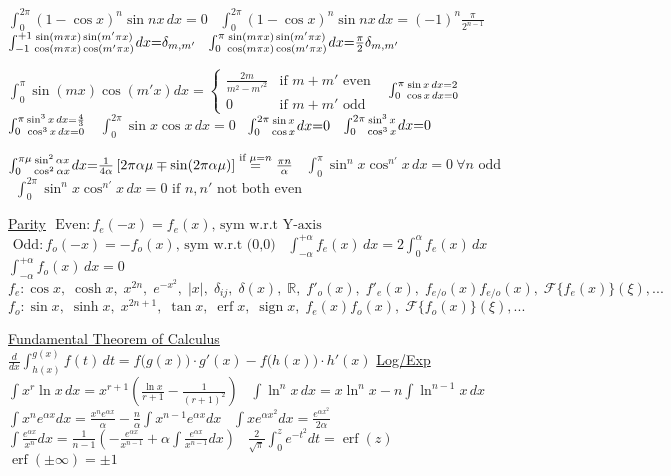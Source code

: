 {$\int_0^{2\pi}\!(1{-}\cos x)^n\sin nx\,dx{=}0$ \
$\int_0^{2\pi}\!(1{-}\cos x)^n\sin nx\,dx{=}(-1)^n\frac{\pi}{2^{n-1}}$ \
$\int_{-1}^{+1}\!\genfrac{}{}{0pt}{}{\sin(m\pi x)\sin(m'\pi x)}{\cos(m\pi x)\cos(m'\pi x)}dx{=}\delta_{m,m'}$ \
$\int_0^\pi\!\genfrac{}{}{0pt}{}{\sin(m\pi x)\sin(m'\pi x)}{\cos(m\pi x)\cos(m'\pi x)}dx{=}\frac{\pi}{2}\delta_{m,m'}$

$\int_0^\pi\!\sin(mx)\cos(m'x)dx{=}\begin{cases}\frac{2m}{m^2-m'^2}&\text{if }m{+}m'\text{ even}\\0&\text{if }m{+}m'\text{ odd}\end{cases}$ \
$\int_0^\pi\!\genfrac{}{}{0pt}{}{\sin x\,dx{=}2}{\cos x\,dx{=}0}$ \
$\int_0^\pi\!\genfrac{}{}{0pt}{}{\sin^3x\,dx{=}\frac{4}{3}}{\cos^3x\,dx{=}0}$ \
$\int_0^{2\pi}\!\sin x\cos x\,dx{=}0$ \
$\int_0^{2\pi}\!\genfrac{}{}{0pt}{}{\sin x}{\cos x}dx{=}0$ \
$\int_0^{2\pi}\!\genfrac{}{}{0pt}{}{\sin^3x}{\cos^3x}dx{=}0$

$\int_0^{\pi\mu}\!\genfrac{}{}{0pt}{}{\sin^2\alpha x}{\cos^2\alpha x}dx{=}\frac{1}{4\alpha}\left[2\pi\alpha\mu\mp\sin(2\pi\alpha\mu)\right]\stackrel{\text{if }\mu{=}n}{=}\frac{\pi n}{\alpha}$ \
$\int_0^\pi\!\sin^nx\cos^{n'}x\,dx{=}0\ \forall n\text{ odd}$ \
$\int_0^{2\pi}\!\sin^nx\cos^{n'}\!x\,dx{=}0\text{ if }n,n'\text{ not both even}$

\underline{Parity} 
$\text{ Even}: f_e(-x) = f_e(x)\text{, sym w.r.t Y-axis}$
$\text{ Odd}: f_o(-x) = -f_o(x)\text{, sym w.r.t (0,0)}$  
\
$\int_{-\alpha}^{+\alpha}\!f_e(x)\,dx{=}2\int_{0}^{\alpha}\!f_e(x)\,dx$
\;\;  $\int_{-\alpha}^{+\alpha}\!f_o(x)\,dx{=}0$ 
\\
\scriptsize{$f_e\!\!: \! \cos x,\; \!\cosh x,\;\! x^{2n},\;\! e^{-x^2}\!,\;\! |x|,\;\! \delta_{ij},\;\! \delta(x),\;\! \mathbb{R}, \;\!  f'_o(x), \; \! f'_e(x),\;\! f_{\!e\!/\!o}\!(x)f_{\!e\!/\!o}\!(x), \;\!\mathcal{F}\{f_e(x)\} (\xi),...$} \\
\scriptsize{$f_o\!:  \sin x,\; \sinh x,\; x^{2n+1},\; \tan x,\; \operatorname{erf}x,\; \operatorname{sign}x,\; f_e (x) f_o (x), \;\mathcal{F}\{f_o(x)\} (\xi) ,...$}

\underline{Fundamental Theorem of Calculus}
$\frac{d}{dx}\int_{h(x)}^{g(x)} f(t) \, dt =  f\big(g(x)\big) \cdot g'(x) - f\big(h(x)\big) \cdot h'(x)$
\underline{Log/Exp} 
$\int\!x^r\ln x\,dx{=}x^{r+1}\left(\frac{\ln x}{r+1}{-}\frac{1}{(r+1)^2}\right)$ \
$\int\!\ln^nx\,dx{=}x\ln^n x{-}n\int\!\ln^{n-1}x\,dx$ \
$\int\!x^ne^{\alpha x}dx{=}\frac{x^ne^{\alpha x}}{\alpha}{-}\frac{n}{\alpha}\int\!x^{n-1}e^{\alpha x}dx$ \
$\int\!xe^{\alpha x^2}dx{=}\frac{e^{\alpha x^2}}{2\alpha}$ \
$\int\!\frac{e^{\alpha x}}{x^n}dx{=}\frac{1}{n{-}1}\left({-}\frac{e^{\alpha x}}{x^{n-1}}{+}\alpha\int\!\frac{e^{\alpha x}}{x^{n-1}}dx\right)$ \
$\frac{2}{\sqrt{\pi}}\int_0^ze^{-t^2}dt{=}\operatorname{erf}(z)$ \ $\operatorname{erf}(\pm \infty){=}\pm1$

}
